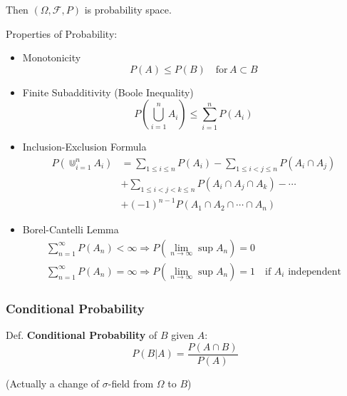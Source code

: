     Then $(\Omega,\mathscr{F},P)$ is probability space.

    Properties of Probability:
    \begin{itemize}
        \item Monotonicity
        \begin{equation}    
            P(A)\leq P(B)\quad \text{for}\, A\subset B
        \end{equation}
        \item Finite Subadditivity (Boole Inequality)
        \begin{equation}    
            P(\bigcup_{i=1}^nA_i)\leq\sum_{i=1}^n P(A_i)    
        \end{equation}
        \item Inclusion-Exclusion Formula
        \begin{align*}
            P(\Cup_{i=1}^nA_i)&=\sum_{1\leq i\leq n}P(A_i)-\sum_{1\leq i<j\leq n}P(A_i\cap A_j)\\
            &+\sum_{1\leq i<j<k\leq n}P(A_i\cap A_j\cap A_k)-\cdots\\
            &+(-1)^{n-1}P(A_1 \cap A_2\cap\cdots \cap A_n)
        \end{align*}
        \item Borel-Cantelli Lemma
        \begin{gather*}
            \sum_{n=1}^\infty P(A_n)<\infty\Rightarrow P(\lim_{n\to\infty}\sup A_n)=0\\
            \sum_{n=1}^\infty P(A_n)=\infty\Rightarrow P(\lim_{n\to\infty}\sup A_n)=1\quad \text{if }A_i\text{ independent}
        \end{gather*}
    \end{itemize}


\subsubsection{Conditional Probability}
        Def. \textbf{Conditional Probability} of $B$ given $A$:
        \begin{equation}    
            P(B|A)=\frac{P(A\cap B)}{P(A)}    
        \end{equation}

        (Actually a change of $\sigma$-field from $\Omega$ to $B$)

